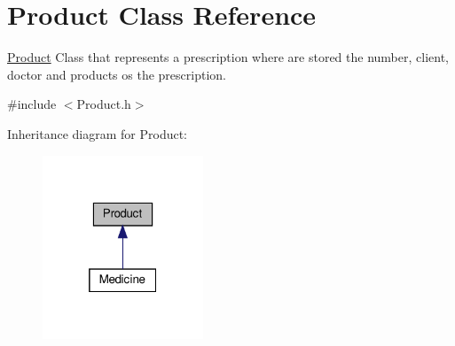 \hypertarget{classProduct}{}\section{Product Class Reference}
\label{classProduct}


\hyperlink{classProduct}{Product} Class that represents a prescription where are stored the number, client, doctor and products os the prescription.  




{\ttfamily \#include $<$Product.\+h$>$}



Inheritance diagram for Product\+:\nopagebreak
\begin{figure}[H]
\begin{center}
\leavevmode
\includegraphics[width=136pt]{classProduct__inherit__graph}
\end{center}
\end{figure}
